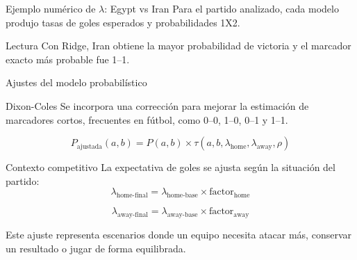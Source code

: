 \documentclass[aspectratio=169]{beamer}
\begin{document}
\begin{frame}[t]{Ejemplo numérico de $\lambda$: Egypt vs Iran}
\scriptsize
\centering
Para el partido analizado, cada modelo produjo tasas de goles esperados y probabilidades 1X2.

\vspace{0.2cm}

\vspace{0.25cm}
\begin{block}{Lectura}
Con Ridge, Iran obtiene la mayor probabilidad de victoria y el marcador exacto más probable fue 1--1.
\end{block}
\end{frame}

\begin{frame}{Ajustes del modelo probabilístico}
\begin{block}{Dixon-Coles}
Se incorpora una corrección para mejorar la estimación de marcadores cortos, frecuentes en fútbol, como 0--0, 1--0, 0--1 y 1--1.

\[
P_{\text{ajustada}}(a,b)=P(a,b)\times \tau(a,b,\lambda_{\text{home}},\lambda_{\text{away}},\rho)
\]
\end{block}

\vspace{0.25cm}
\begin{block}{Contexto competitivo}
La expectativa de goles se ajusta según la situación del partido:
\[
\lambda_{\text{home-final}}=\lambda_{\text{home-base}}\times \text{factor}_{\text{home}}
\]

\[
\lambda_{\text{away-final}}=\lambda_{\text{away-base}}\times \text{factor}_{\text{away}}
\]
\end{block}

\vspace{0.2cm}
Este ajuste representa escenarios donde un equipo necesita atacar más, conservar un resultado o jugar de forma equilibrada.
\end{frame}
\end{document}
